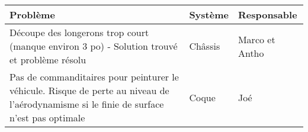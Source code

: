 \begin{tabularx}{\linewidth}{
    |>{\hsize=2.0\hsize}X|%
    >{\hsize=0.5\hsize}X|%
    >{\hsize=0.5\hsize}X|%
  }
    \hline
    \textbf{Problème} & \textbf{Système} & \textbf{Responsable}
    \\\hline
    Découpe des longerons trop court (manque environ 3 po) - Solution trouvé et problème résolu & Châssis & Marco et Antho\\\hline
    Pas de commanditaires pour peinturer le véhicule. Risque de perte au niveau de l'aérodynamisme si le finie de surface n'est pas optimale & Coque & Joé \\\hline

  \end{tabularx}
    
    
